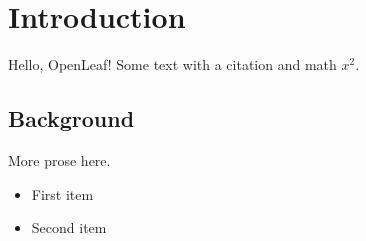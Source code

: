 \documentclass{article}
\begin{document}
\section{Introduction}
Hello, OpenLeaf! Some text with a citation \cite{knuth1984} and math $x^2$.

\subsection{Background}
\label{sec:background}
More prose here.


\begin{itemize}
  \item First item
  \item Second item
\end{itemize}
\end{document}

